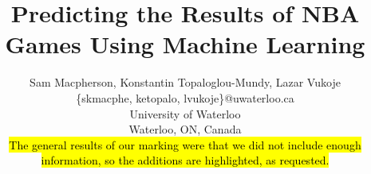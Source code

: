 \documentclass[letterpaper]{article} %
\begin{document}
%
\title{Predicting the Results of NBA Games Using Machine Learning}
\author{Sam Macpherson, Konstantin Topaloglou-Mundy, Lazar Vukoje\\
\{skmacphe, ketopalo, lvukoje\}@uwaterloo.ca\\
University of Waterloo\\
Waterloo, ON, Canada\\
\hl{The general results of our marking were that we did not include enough information, so the additions are highlighted, as requested.}
}
\maketitle


\end{document}
